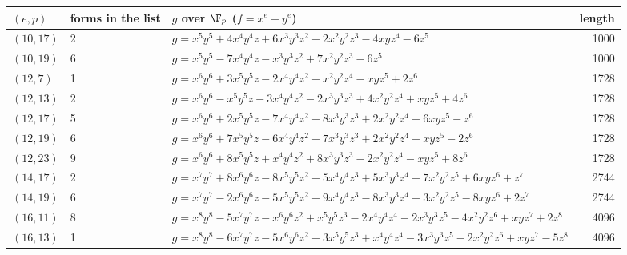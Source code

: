 \begin{tabular}{@{}ll>{\raggedright\arraybackslash}p{7.4cm}r@{}}
\toprule
$(e,p)$ & forms in the list & $g$ over $\F_p$ ($f=x^e+y^e$) & length\\
\midrule
$(10,17)$ & 2 & $g=x^{5}y^{5} + 4x^{4}y^{4}z + 6x^{3}y^{3}z^{2} + 2x^{2}y^{2}z^{3} - 4xyz^{4} - 6z^{5}$ & 1000\\
$(10,19)$ & 6 & $g=x^{5}y^{5} - 7x^{4}y^{4}z - x^{3}y^{3}z^{2} + 7x^{2}y^{2}z^{3} - 6z^{5}$ & 1000\\
$(12,7)$ & 1 & $g=x^{6}y^{6} + 3x^{5}y^{5}z - 2x^{4}y^{4}z^{2} - x^{2}y^{2}z^{4} - xyz^{5} + 2z^{6}$ & 1728\\
$(12,13)$ & 2 & $g=x^{6}y^{6} - x^{5}y^{5}z - 3x^{4}y^{4}z^{2} - 2x^{3}y^{3}z^{3} + 4x^{2}y^{2}z^{4} + xyz^{5} + 4z^{6}$ & 1728\\
$(12,17)$ & 5 & $g=x^{6}y^{6} + 2x^{5}y^{5}z - 7x^{4}y^{4}z^{2} + 8x^{3}y^{3}z^{3} + 2x^{2}y^{2}z^{4} + 6xyz^{5} - z^{6}$ & 1728\\
$(12,19)$ & 6 & $g=x^{6}y^{6} + 7x^{5}y^{5}z - 6x^{4}y^{4}z^{2} - 7x^{3}y^{3}z^{3} + 2x^{2}y^{2}z^{4} - xyz^{5} - 2z^{6}$ & 1728\\
$(12,23)$ & 9 & $g=x^{6}y^{6} + 8x^{5}y^{5}z + x^{4}y^{4}z^{2} + 8x^{3}y^{3}z^{3} - 2x^{2}y^{2}z^{4} - xyz^{5} + 8z^{6}$ & 1728\\
$(14,17)$ & 2 & $g=x^{7}y^{7} + 8x^{6}y^{6}z - 8x^{5}y^{5}z^{2} - 5x^{4}y^{4}z^{3} + 5x^{3}y^{3}z^{4} - 7x^{2}y^{2}z^{5} + 6xyz^{6} + z^{7}$ & 2744\\
$(14,19)$ & 6 & $g=x^{7}y^{7} - 2x^{6}y^{6}z - 5x^{5}y^{5}z^{2} + 9x^{4}y^{4}z^{3} - 8x^{3}y^{3}z^{4} - 3x^{2}y^{2}z^{5} - 8xyz^{6} + 2z^{7}$ & 2744\\
$(16,11)$ & 8 & $g=x^{8}y^{8} - 5x^{7}y^{7}z - x^{6}y^{6}z^{2} + x^{5}y^{5}z^{3} - 2x^{4}y^{4}z^{4} - 2x^{3}y^{3}z^{5} - 4x^{2}y^{2}z^{6} + xyz^{7} + 2z^{8}$ & 4096\\
$(16,13)$ & 1 & $g=x^{8}y^{8} - 6x^{7}y^{7}z - 5x^{6}y^{6}z^{2} - 3x^{5}y^{5}z^{3} + x^{4}y^{4}z^{4} - 3x^{3}y^{3}z^{5} - 2x^{2}y^{2}z^{6} + xyz^{7} - 5z^{8}$ & 4096\\
\bottomrule
\end{tabular}
